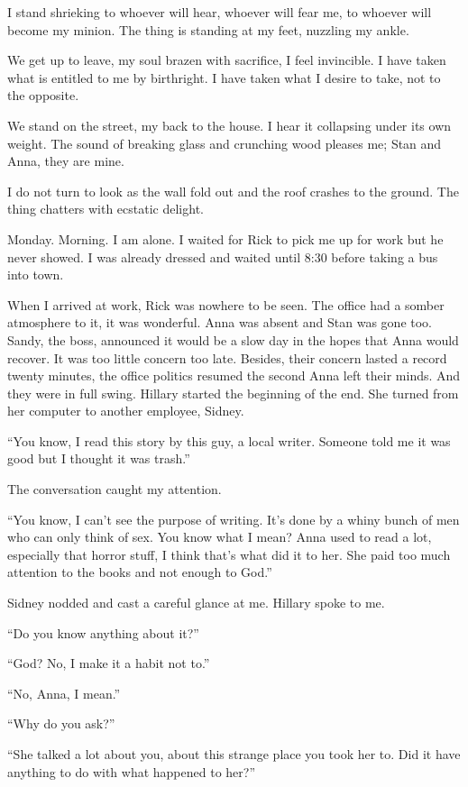 I stand shrieking to whoever will hear, whoever will fear me, to whoever
will become my minion. The thing is standing at my feet, nuzzling my
ankle.

We get up to leave, my soul brazen with sacrifice, I feel invincible. I
have taken what is entitled to me by birthright. I have taken what I
desire to take, not to the opposite.

We stand on the street, my back to the house. I hear it collapsing under
its own weight. The sound of breaking glass and crunching wood pleases
me; Stan and Anna, they are mine.

I do not turn to look as the wall fold out and the roof crashes to the
ground. The thing chatters with ecstatic delight.

Monday. Morning. I am alone. I waited for Rick to pick me up for work
but he never showed. I was already dressed and waited until 8:30 before
taking a bus into town.

When I arrived at work, Rick was nowhere to be seen. The office had a
somber atmosphere to it, it was wonderful. Anna was absent and Stan was
gone too. Sandy, the boss, announced it would be a slow day in the hopes
that Anna would recover. It was too little concern too late. Besides,
their concern lasted a record twenty minutes, the office politics
resumed the second Anna left their minds. And they were in full swing.
Hillary started the beginning of the end. She turned from her computer
to another employee, Sidney.

``You know, I read this story by this guy, a local writer. Someone told
me it was good but I thought it was trash.''

The conversation caught my attention.

``You know, I can't see the purpose of writing. It's done by a whiny
bunch of men who can only think of sex. You know what I mean? Anna used
to read a lot, especially that horror stuff, I think that's what did it
to her. She paid too much attention to the books and not enough to
God.''

Sidney nodded and cast a careful glance at me. Hillary spoke to me.

``Do you know anything about it?''

``God? No, I make it a habit not to.''

``No, Anna, I mean.''

``Why do you ask?''

``She talked a lot about you, about this strange place you took her to.
Did it have anything to do with what happened to her?''

